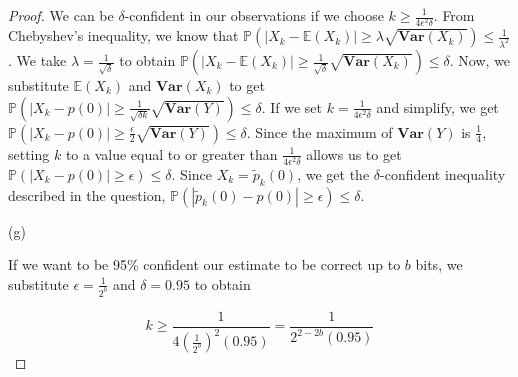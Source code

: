 \begin{proof}
We can be \(\delta\)-confident in our observations if we choose \(k \geq \frac{1}{4 \epsilon^2 \delta}\). From Chebyshev's inequality, we know that \(\mathbb{P}(|X_k - \mathbb{E}(X_k)| \geq \lambda \sqrt{\textbf{Var}(X_k)}) \leq \frac{1}{\lambda^2}\). We take \(\lambda = \frac{1}{\sqrt{\delta}}\) to obtain \(\mathbb{P}(|X_k - \mathbb{E}(X_k)| \geq \frac{1}{\sqrt{\delta}} \sqrt{\textbf{Var}(X_k)}) \leq \delta\). Now, we substitute \(\mathbb{E}(X_k)\) and \(\textbf{Var}(X_k)\) to get \(\mathbb{P}(|X_k - p(0)| \geq \frac{1}{\sqrt{\delta k}} \sqrt{\textbf{Var}(Y)}) \leq \delta\). If we set \(k = \frac{1}{4 \epsilon^2 \delta}\) and simplify, we get \(\mathbb{P}(|X_k - p(0)| \geq \frac{\epsilon}{2} \sqrt{\textbf{Var}(Y)}) \leq \delta\). Since the maximum of \(\textbf{Var}(Y)\) is \(\frac{1}{4}\), setting \(k\) to a value equal to or greater than \(\frac{1}{4 \epsilon^2 \delta}\) allows us to get \(\mathbb{P}(|X_k - p(0)| \geq \epsilon) \leq \delta\). Since \(X_k = \tilde{p}_k(0)\), we get the \(\delta\)-confident inequality described in the question, \(\mathbb{P}(|\tilde{p}_k(0) - p(0)| \geq \epsilon) \leq \delta\).

(g)

If we want to be 95\% confident our estimate to be correct up to \(b\) bits, we substitute \(\epsilon = \frac{1}{2^b}\) and \(\delta = 0.95\) to obtain

\[ k \geq \frac{1}{4\left(\frac{1}{2^b}\right)^2(0.95)} = \frac{1}{2^{2-2b}(0.95)} \]
\end{proof}

